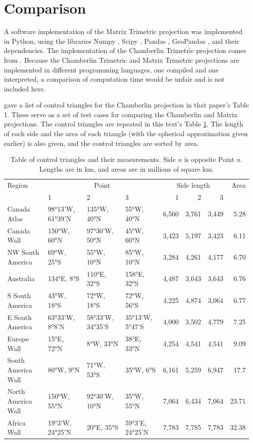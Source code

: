 \documentclass[]{interact}
\begin{document}
\section{Comparison}
A software implementation of the Matrix Trimetric projection was implemented in
Python, using the libraries Numpy \citep{numpy}, Scipy \citep{scipy}, Pandas
\citep{pandas}, GeoPandas \citep{geopandas}, and their dependencies. The
implementation of the Chamberlin Trimetric projection comes from \citet{proj}.
Because the Chamberlin Trimetric and Matrix Trimetric projections are
implemented in different programming languages,
one compiled and one interpreted,
a comparison of computation time would be unfair and is not included here.

\citet{christensen} gave a list of control triangles for the Chamberlin
projection in that paper's Table 1. These serve as a set of test cases for
comparing the Chamberlin and Matrix projections. The control triangles are
repeated in this text's Table \ref{table:ctrlpts}. The length of each side and
the area of each triangle (with the spherical approximation given earlier)
is also given, and the control triangles are sorted by area.

\begin{table}
\begin{tabular}{ p{2.5cm} | p{1.5cm} p{1.5cm} p{1.5cm} | r r r | r }
Region & \multicolumn{3}{c}{Point} & \multicolumn{3}{c}{Side length} & Area \\
& 1 & 2 & 3 & 1 & 2 & 3 & \\
\hline
Canada \mbox{Atlas} & 98°13'W, 61°39'N & 135°W, 40°N & 55°W, 40°N & 6,560 & 3,761 & 3,449 & 5.28 \\
Canada Wall & 150°W, 60°N & 97°30'W, 50°N & 45°W, 60°N & 3,423 & 5,197 & 3,423 & 6.11 \\
NW South \mbox{America} & 69°W, 25°S & 55°W, 10°N & 85°W, 10°N & 3,284 & 4,261 & 4,177 & 6.70 \\
Australia & 134°E, 8°S & 110°E, 32°S & 158°E, 32°S & 4,487 & 3,643 & 3,643 & 6.76 \\
S South \mbox{America} & 43°W, 18°S & 72°W, 18°S & 72°W, 56°S & 4,225 & 4,874 & 3,064 & 6.77 \\
E South \mbox{America} & 63°33'W, 8°8'N & 58°33'W, 34°35'S & 35°13'W, 5°47'S & 4,000 & 3,502 & 4,779 & 7.25 \\
Europe Wall & 15°E, 72°N & 8°W, 33°N & 38°E, 33°N & 4,254 & 4,541 & 4,541 & 9.09 \\
South \mbox{America} Wall & 80°W, 9°N & 71°W, 53°S & 35°W, 6°S & 6,161 & 5,259 & 6,947 & 17.7 \\
North \mbox{America} Wall & 150°W, 55°N & 92°30'W, 10°N & 35°W, 55°N & 7,064 & 6,434 & 7,064 & 23.71 \\
Africa Wall & 19°3'W, 24°25'N & 20°E, 35°S & 59°3'E, 24°25'N & 7,783 & 7,785 & 7,783 & 32.38
\end{tabular}
\caption{Table of control triangles and their measurements. Side $n$ is opposite Point $n$.
Lengths are in km, and areas are in millions of square km.}
\label{table:ctrlpts}
\end{table}
\end{document}
